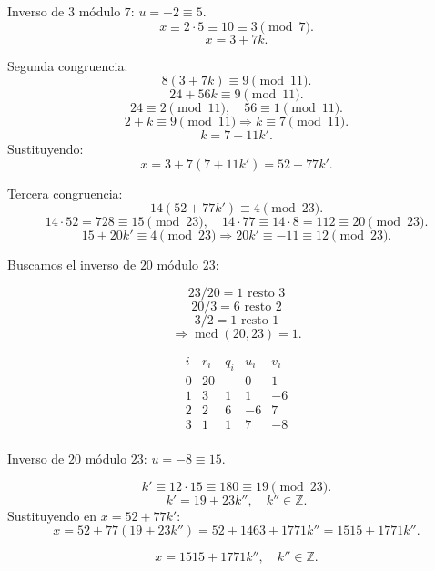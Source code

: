 \documentclass[a4paper,12pt]{article}
\begin{document}
\begin{ejercicio}[title=Ejercicio 37]

Inverso de $3$ módulo $7$: $u = -2 \equiv 5$.  
\[
x \equiv 2\cdot 5 \equiv 10 \equiv 3 \pmod{7}.
\]
\[
x = 3 + 7k.
\]

Segunda congruencia:
\[
8(3 + 7k) \equiv 9 \pmod{11}.
\]
\[
24 + 56k \equiv 9 \pmod{11}.
\]
\[
24 \equiv 2 \pmod{11},\quad 56 \equiv 1 \pmod{11}.
\]
\[
2 + k \equiv 9 \pmod{11} \Rightarrow k \equiv 7 \pmod{11}.
\]
\[
k = 7 + 11k'.
\]
Sustituyendo:
\[
x = 3 + 7(7 + 11k') = 52 + 77k'.
\]

Tercera congruencia:
\[
14(52 + 77k') \equiv 4 \pmod{23}.
\]
\[
14\cdot 52 = 728 \equiv 15 \pmod{23},\quad 14\cdot 77 \equiv 14\cdot 8 = 112 \equiv 20 \pmod{23}.
\]
\[
15 + 20k' \equiv 4 \pmod{23} \Rightarrow 20k' \equiv -11 \equiv 12 \pmod{23}.
\]

Buscamos el inverso de $20$ módulo $23$:

\[
23 / 20 = 1 \text{ resto } 3
\]
\[
20 / 3 = 6 \text{ resto } 2
\]
\[
3 / 2 = 1 \text{ resto } \boxed{1}
\]
\[
\Rightarrow \operatorname{mcd}(20,23) = 1.
\]

\[
\begin{array}{c|c|c|c|c}
i & r_i & q_i & u_i & v_i \\ \hline
0 & 20 & - & 0 & 1 \\
1 & 3 & 1 & 1 & -6 \\
2 & 2 & 6 & -6 & 7 \\
3 & \boxed{1} & 1 & 7 & -8 \\
\end{array}
\]

Inverso de $20$ módulo $23$: $u = -8 \equiv 15$.

\[
k' \equiv 12\cdot 15 \equiv 180 \equiv 19 \pmod{23}.
\]
\[
k' = 19 + 23k'',\quad k''\in\mathbb{Z}.
\]
Sustituyendo en $x = 52 + 77k'$:
\[
x = 52 + 77(19 + 23k'') = 52 + 1463 + 1771k'' = 1515 + 1771k''.
\]

\[
\boxed{x = 1515 + 1771k'',\quad k''\in\mathbb{Z}.}
\]

\end{ejercicio}
\end{document}
